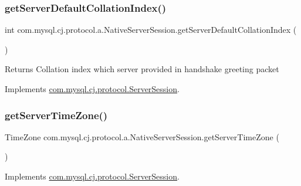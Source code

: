 \subsubsection{\texorpdfstring{get\+Server\+Default\+Collation\+Index()}{getServerDefaultCollationIndex()}}
{\footnotesize\ttfamily int com.\+mysql.\+cj.\+protocol.\+a.\+Native\+Server\+Session.\+get\+Server\+Default\+Collation\+Index (\begin{DoxyParamCaption}{ }\end{DoxyParamCaption})}

\begin{DoxyReturn}{Returns}
Collation index which server provided in handshake greeting packet 
\end{DoxyReturn}


Implements \mbox{\hyperlink{interfacecom_1_1mysql_1_1cj_1_1protocol_1_1_server_session_a840bf74b75252459afd6b33ae21c8379}{com.\+mysql.\+cj.\+protocol.\+Server\+Session}}.

\mbox{\label{classcom_1_1mysql_1_1cj_1_1protocol_1_1a_1_1_native_server_session_a2bb2db7f0947a9fc9b287baa6a314314}} 
\subsubsection{\texorpdfstring{get\+Server\+Time\+Zone()}{getServerTimeZone()}}
{\footnotesize\ttfamily Time\+Zone com.\+mysql.\+cj.\+protocol.\+a.\+Native\+Server\+Session.\+get\+Server\+Time\+Zone (\begin{DoxyParamCaption}{ }\end{DoxyParamCaption})}



Implements \mbox{\hyperlink{interfacecom_1_1mysql_1_1cj_1_1protocol_1_1_server_session_ac9b676155f1488748f697afbf1e10999}{com.\+mysql.\+cj.\+protocol.\+Server\+Session}}.

\mbox{\label{classcom_1_1mysql_1_1cj_1_1protocol_1_1a_1_1_native_server_session_ac4c00989ffc6de351aa574fb6cc4a24b}} 

